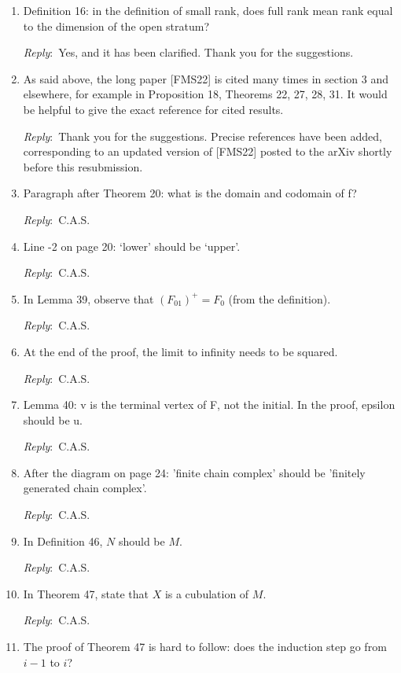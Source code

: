 \documentclass{amsart}
\newcommand{\ar}{\medskip\noindent\textit{Reply}:\ }
\newcommand{\cas}{\ar C.A.S.}
\begin{document}
\begin{enumerate}
	\ar Clarified. Thank you for the suggestion.

	\item Definition 16: in the definition of small rank, does full rank mean rank equal to the dimension of the open stratum?

	\ar Yes, and it has been clarified. Thank you for the suggestions.

	\item As said above, the long paper [FMS22] is cited many times in section 3 and elsewhere, for example in Proposition 18, Theorems 22, 27, 28, 31. It would be helpful to give the exact reference for cited results.

	\ar Thank you for the suggestions. Precise references have been added, corresponding to an updated version of [FMS22] posted to the arXiv shortly before this resubmission.

	\item Paragraph after Theorem 20: what is the domain and codomain of f?

	\cas

	\item Line -2 on page 20: `lower' should be `upper'.

	\cas

	\item In Lemma 39, observe that $(F_{01})^+ = F_0$ (from the definition).

	\cas

	\item At the end of the proof, the limit to infinity needs to be squared.

	\cas

	\item Lemma 40: v is the terminal vertex of F, not the initial. In the proof, epsilon should be u.

	\cas

	\item After the diagram on page 24: 'finite chain complex' should be 'finitely generated chain complex'.

	\cas

	\item In Definition 46, $N$ should be $M$.

	\cas

	\item In Theorem 47, state that $X$ is a cubulation of $M$.

	\cas

	\item The proof of Theorem 47 is hard to follow: does the induction step go from $i-1$ to $i$?


\end{enumerate}
\end{document}
